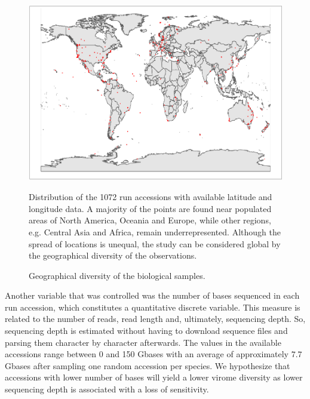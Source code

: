 \documentclass[
  openany]{book}
\begin{document}
\begin{figure}[!htbp]

\begin{center}\includegraphics{_main_files/figure-latex/worldmap-1} \end{center}

\caption{Geographical diversity of the biological samples. \label{fig:worldmap}}
Distribution of the 1072 run accessions with available latitude and longitude data. A majority of the points are found near populated areas of North America, Oceania and Europe, while other regions, e.g. Central Asia and Africa, remain underrepresented. Although the spread of locations is unequal, the study can be considered global by the geographical diversity of the observations.
\end{figure}

Another variable that was controlled was the number of bases sequenced in each run accession, which constitutes a quantitative discrete variable. This measure is related to the number of reads, read length and, ultimately, sequencing depth. So, sequencing depth is estimated without having to download sequence files and parsing them character by character afterwards. The values in the available accessions range between 0 and 150 Gbases with an average of approximately \(7.7\) Gbases after sampling one random accession per species. We hypothesize that accessions with lower number of bases will yield a lower virome diversity as lower sequencing depth is associated with a loss of sensitivity.
\end{document}
